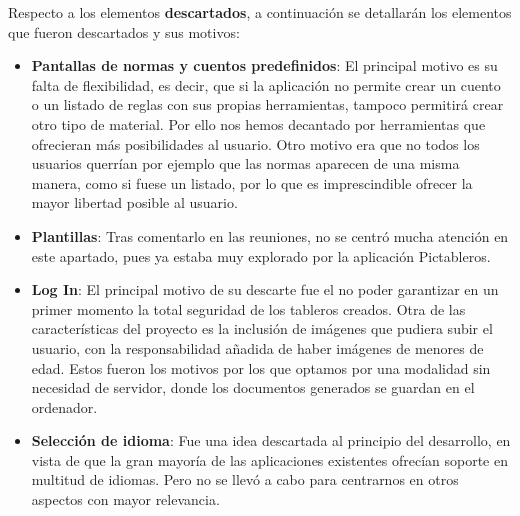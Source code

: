 Respecto a los elementos \textbf{descartados}, a continuación se detallarán los elementos que fueron descartados y sus motivos:

\begin{itemize}
	\item\textbf{Pantallas de normas y cuentos predefinidos}: El principal motivo es su falta de flexibilidad, es decir, que si la aplicación no permite crear un cuento o un listado de reglas con sus propias herramientas, tampoco permitirá crear otro tipo de material. Por ello nos hemos decantado por herramientas que ofrecieran más posibilidades al usuario. Otro motivo era que no todos los usuarios querrían por ejemplo que las normas aparecen de una misma manera, como si fuese un listado, por lo que es imprescindible ofrecer la mayor libertad posible al usuario.
	
	\item \textbf{Plantillas}: Tras comentarlo en las reuniones, no se centró mucha atención en este apartado, pues ya estaba muy explorado por la aplicación Pictableros.
	
	\item \textbf{Log In}: El principal motivo de su descarte fue el no poder garantizar en un primer momento la total seguridad de los tableros creados.
	Otra de las características del proyecto es la inclusión de imágenes que pudiera subir el usuario, con la responsabilidad añadida de haber imágenes de menores de edad. Estos fueron los motivos por los que optamos por una modalidad sin necesidad de servidor, donde los documentos generados se guardan en el ordenador.
	
	\item \textbf{Selección de idioma}: Fue una idea descartada al principio del desarrollo, en vista de que la gran mayoría de las aplicaciones existentes ofrecían soporte en multitud de idiomas. Pero no se llevó a cabo para centrarnos en otros aspectos con mayor relevancia.
	
\end{itemize}






